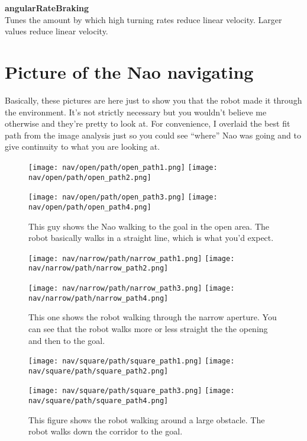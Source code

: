 \textbf{angularRateBraking}        \\
Tunes the amount by which high turning rates reduce linear velocity.
Larger values reduce linear velocity. \\


\section{Picture of the Nao navigating}

Basically, these pictures are here just to show you that the robot
made it through the environment. It's not strictly necessary but you wouldn't
believe me otherwise and they're pretty to look at.
For convenience, I overlaid the best fit path from the image analysis just
so you could see ``where'' Nao was going and to give continuity to what you
are looking at.

\begin{figure}
  \centerline{
    \texttt{[image: nav/open/path/open\_path1.png]}
    \texttt{[image: nav/open/path/open\_path2.png]}
  }
  \vspace*{0.05in}
  \centerline{
    \texttt{[image: nav/open/path/open\_path3.png]}
    \texttt{[image: nav/open/path/open\_path4.png]}
  }
  \caption{This guy shows the Nao walking to the goal in the open area.
           The robot basically walks in a straight line, which is what you'd expect.}
  \label{fig:nav_open_frames1}
  \vspace*{-0.07in}
\end{figure}

\begin{figure}
  \centerline{
    \texttt{[image: nav/narrow/path/narrow\_path1.png]}
    \texttt{[image: nav/narrow/path/narrow\_path2.png]}
  }
  \vspace*{0.05in}
  \centerline{
    \texttt{[image: nav/narrow/path/narrow\_path3.png]}
    \texttt{[image: nav/narrow/path/narrow\_path4.png]}
  }
    \caption{This one shows the robot walking through the narrow aperture.
             You can see that the robot walks more or less straight the the opening and then to the goal.}
    \label{fig:nav_narrow_frames1}
        \vspace*{-0.07in}
\end{figure}

\begin{figure}
  \centerline{
    \texttt{[image: nav/square/path/square\_path1.png]}
    \texttt{[image: nav/square/path/square\_path2.png]}
  }
  \vspace*{0.05in}
  \centerline{
    \texttt{[image: nav/square/path/square\_path3.png]}
    \texttt{[image: nav/square/path/square\_path4.png]}
  }
    \caption{This figure shows the robot walking around a large obstacle.
             The robot walks down the corridor to the goal.}
    \label{fig:nav_square_frames1}
        \vspace*{-0.07in}
\end{figure}

